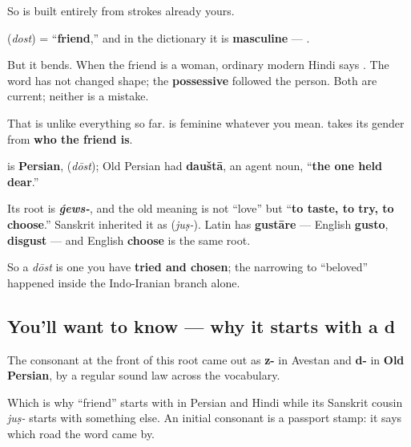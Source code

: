 So \textbf{ } is built entirely from strokes already yours.

\begin{grammarlens}[title={Grammar Lens: the noun that leans on who you mean}]
\textbf{} (\emph{dost}) = \textquotedblleft{}\textbf{friend},\textquotedblright{} and in the dictionary it is \textbf{masculine} — \textbf{ }.

But it bends. When the friend is a woman, ordinary modern Hindi says \textbf{ }. The word has not changed shape; the \textbf{possessive} followed the person. Both are current; neither is a mistake.

That is unlike everything so far. \textbf{} is feminine whatever you mean. \textbf{} takes its gender from \textbf{who the friend is}.
\end{grammarlens}

\begin{cousinweb}
\textbf{} is \textbf{Persian}, \textbf{} (\emph{dōst}); Old Persian had \textbf{dauštā}, an agent noun, \textquotedblleft{}\textbf{the one held dear}.\textquotedblright{}

Its root is \emph{\textbf{ǵews-}}, and the old meaning is not \textquotedblleft{}love\textquotedblright{} but \textquotedblleft{}\textbf{to taste, to try, to choose}.\textquotedblright{} Sanskrit inherited it as \textbf{} (\emph{juṣ-}). Latin has \textbf{gustāre} — English \textbf{gusto}, \textbf{disgust} — and English \textbf{choose} is the same root.

So a \emph{dōst} is one you have \textbf{tried and chosen}; the narrowing to \textquotedblleft{}beloved\textquotedblright{} happened inside the Indo-Iranian branch alone.
\end{cousinweb}

\subsection*{You'll want to know — why it starts with a d}
The consonant at the front of this root came out as \textbf{z-} in Avestan and \textbf{d-} in \textbf{Old Persian}, by a regular sound law across the vocabulary.

Which is why \textquotedblleft{}friend\textquotedblright{} starts with \textbf{} in Persian and Hindi while its Sanskrit cousin \emph{juṣ-} starts with something else. An initial consonant is a passport stamp: it says which road the word came by.

